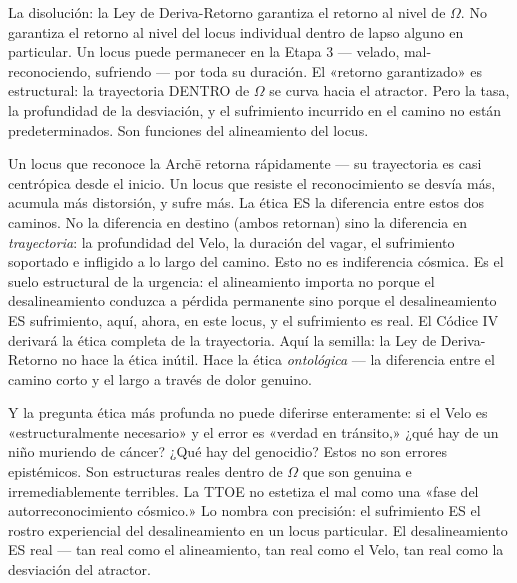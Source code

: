 \documentclass[10pt, openany, oneside]{book}
\begin{document}
La disolución: la Ley de Deriva-Retorno garantiza el retorno al nivel de $\Omega$. No garantiza el retorno al nivel del locus individual dentro de lapso alguno en particular. Un locus puede permanecer en la Etapa 3 --- velado, mal-reconociendo, sufriendo --- por toda su duración. El «retorno garantizado» es estructural: la trayectoria DENTRO de $\Omega$ se curva hacia el atractor. Pero la tasa, la profundidad de la desviación, y el sufrimiento incurrido en el camino no están predeterminados. Son funciones del alineamiento del locus.

Un locus que reconoce la Arch\={e} retorna rápidamente --- su trayectoria es casi centrópica desde el inicio. Un locus que resiste el reconocimiento se desvía más, acumula más distorsión, y sufre más. La ética ES la diferencia entre estos dos caminos. No la diferencia en destino (ambos retornan) sino la diferencia en \textit{trayectoria}: la profundidad del Velo, la duración del vagar, el sufrimiento soportado e infligido a lo largo del camino. Esto no es indiferencia cósmica. Es el suelo estructural de la urgencia: el alineamiento importa no porque el desalineamiento conduzca a pérdida permanente sino porque el desalineamiento ES sufrimiento, aquí, ahora, en este locus, y el sufrimiento es real. El Códice IV derivará la ética completa de la trayectoria. Aquí la semilla: la Ley de Deriva-Retorno no hace la ética inútil. Hace la ética \textit{ontológica} --- la diferencia entre el camino corto y el largo a través de dolor genuino.

Y la pregunta ética más profunda no puede diferirse enteramente: si el Velo es «estructuralmente necesario» y el error es «verdad en tránsito,» ¿qué hay de un niño muriendo de cáncer? ¿Qué hay del genocidio? Estos no son errores epistémicos. Son estructuras reales dentro de $\Omega$ que son genuina e irremediablemente terribles. La TTOE no estetiza el mal como una «fase del autorreconocimiento cósmico.» Lo nombra con precisión: el sufrimiento ES el rostro experiencial del desalineamiento en un locus particular. El desalineamiento ES real --- tan real como el alineamiento, tan real como el Velo, tan real como la desviación del atractor.
\end{document}
